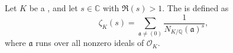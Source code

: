\begin{definition} \label{definition:dedekind_zeta_function_of_a_number_field}
Let $K$ be a , and let $s \in \mathbb{C}$ with $\Re(s) > 1$. The  is defined as
$$\zeta_K(s) = \sum_{\mathfrak{a} \neq (0)} \frac{1}{N_{K/\mathbb{Q}}(\mathfrak{a})^{s}},$$
where $\mathfrak{a}$ runs over all nonzero ideals of $\mathcal{O}_K$.
\end{definition}